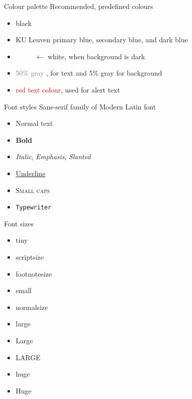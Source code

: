 \documentclass[11pt,t]{beamer}
\begin{document}
	\begin{frame}{Colour palette}
		Recommended, predefined colours
		\begin{itemize}
			\item black
			\item \textcolor{kul-blue}{KU Leuven primary blue}, \textcolor{kul-secblue}{secondary blue}, and \textcolor{kul-dark}{dark blue}
			\item \textcolor{white}{white} $\leftarrow$ white, when background is dark
			\item \textcolor{gray}{50\% gray }, for text and \textcolor{lgray}{5\% gray} for background

			\vspace{5mm}
			\item \textcolor{red}{red text colour}, used for \alert{alert text}
		\end{itemize}
	\end{frame}




	\begin{frame}{Font styles}
		Sans-serif family of Modern Latin font
		\begin{itemize}
			\item Normal text
			\item \textbf{Bold}
			\item \textit{Italic}, \emph{Emphasis}, \textsl{Slanted}
			\item \underline{Underline}
			\item \textsc{Small caps}
			\item \texttt{Typewriter}
		\end{itemize}
	\end{frame}




	\begin{frame}{Font sizes}
		\begin{itemize}
			\item \tiny tiny
			\item \scriptsize scriptsize
			\item \footnotesize footnotesize
			\item \small small
			\item \normalsize normalsize
			\item \large large
			\item \Large Large
			\item \LARGE LARGE
			\item \huge huge
			\item \Huge Huge
		\end{itemize}
	\end{frame}
\end{document}

